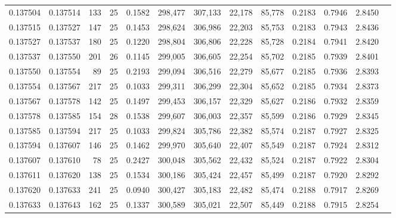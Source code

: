\begin{tabular}{rrrrrrrrrrrrr}
0.137504 & 0.137514 &   133 &  25 &                                     0.1582 & 298,477 & 307,133 &  22,178 &  85,778 & 0.2183 & 0.7946 & 2.8450 \\
0.137515 & 0.137527 &   147 &  25 &                                     0.1453 & 298,624 & 306,986 &  22,203 &  85,753 & 0.2183 & 0.7943 & 2.8436 \\
0.137527 & 0.137537 &   180 &  25 &                                     0.1220 & 298,804 & 306,806 &  22,228 &  85,728 & 0.2184 & 0.7941 & 2.8420 \\
0.137537 & 0.137550 &   201 &  26 &                                     0.1145 & 299,005 & 306,605 &  22,254 &  85,702 & 0.2185 & 0.7939 & 2.8401 \\
0.137550 & 0.137554 &    89 &  25 &                                     0.2193 & 299,094 & 306,516 &  22,279 &  85,677 & 0.2185 & 0.7936 & 2.8393 \\
0.137554 & 0.137567 &   217 &  25 &                                     0.1033 & 299,311 & 306,299 &  22,304 &  85,652 & 0.2185 & 0.7934 & 2.8373 \\
0.137567 & 0.137578 &   142 &  25 &                                     0.1497 & 299,453 & 306,157 &  22,329 &  85,627 & 0.2186 & 0.7932 & 2.8359 \\
0.137578 & 0.137585 &   154 &  28 &                                     0.1538 & 299,607 & 306,003 &  22,357 &  85,599 & 0.2186 & 0.7929 & 2.8345 \\
0.137585 & 0.137594 &   217 &  25 &                                     0.1033 & 299,824 & 305,786 &  22,382 &  85,574 & 0.2187 & 0.7927 & 2.8325 \\
0.137594 & 0.137607 &   146 &  25 &                                     0.1462 & 299,970 & 305,640 &  22,407 &  85,549 & 0.2187 & 0.7924 & 2.8312 \\
0.137607 & 0.137610 &    78 &  25 &                                     0.2427 & 300,048 & 305,562 &  22,432 &  85,524 & 0.2187 & 0.7922 & 2.8304 \\
0.137611 & 0.137620 &   138 &  25 &                                     0.1534 & 300,186 & 305,424 &  22,457 &  85,499 & 0.2187 & 0.7920 & 2.8292 \\
0.137620 & 0.137633 &   241 &  25 &                                     0.0940 & 300,427 & 305,183 &  22,482 &  85,474 & 0.2188 & 0.7917 & 2.8269 \\
0.137633 & 0.137643 &   162 &  25 &                                     0.1337 & 300,589 & 305,021 &  22,507 &  85,449 & 0.2188 & 0.7915 & 2.8254 \\

\end{tabular}
